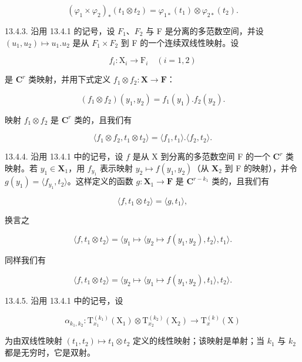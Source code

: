 \[
(\varphi_ {1} \times \varphi_ {2}) _ {*} (t _ {1} \otimes t _ {2}) = \varphi_ {1 *} (t _ {1}) \otimes \varphi_ {2 *} (t _ {2}).
\]

13.4.3. 沿用 13.4.1 的记号，设 \(F_{1}\)、\(F_{2}\) 与 F 是分离的多范数空间，并设 \((u_{1}, u_{2}) \mapsto u_{1}.u_{2}\) 是从 \(F_{1} \times F_{2}\) 到 F 的一个连续双线性映射。设

\[
f _ {i} \colon \mathrm{X} _ {i} \rightarrow \mathrm{F} _ {i} \quad (i = 1, 2)
\]

是 \(\mathbf{C}^r\) 类映射，并用下式定义 \(f_1 \otimes f_2: \mathbf{X} \to \mathbf{F}\)：

\[
(f _ {1} \otimes f _ {2}) (y _ {1}, y _ {2}) = f _ {1} (y _ {1}). f _ {2} (y _ {2}).
\]

映射 \(f_{1} \otimes f_{2}\) 是 \(\mathbf{C}^{r}\) 类的，且我们有

\[
\langle f _ {1} \otimes f _ {2}, t _ {1} \otimes t _ {2} \rangle = \langle f _ {1}, t _ {1} \rangle . \langle f _ {2}, t _ {2} \rangle .
\]

13.4.4. 沿用 13.4.1 中的记号，设 \(f\) 是从 X 到分离的多范数空间 F 的一个 \(\mathbf{C}^{r}\) 类映射。若 \(y_{1} \in \mathbf{X}_{1}\)，用 \(f_{y_{1}}\) 表示映射 \(y_{2} \mapsto f(y_{1}, y_{2})\)（从 \(\mathbf{X}_{2}\) 到 F 的映射），并令 \(g(y_{1}) = \langle f_{y_{1}}, t_{2} \rangle\)。这样定义的函数 \(g: \mathbf{X}_{1} \to \mathbf{F}\) 是 \(\mathbf{C}^{r - k_{1}}\) 类的，且我们有

\[
\langle f, t _ {1} \otimes t _ {2} \rangle = \langle g, t _ {1} \rangle ,
\]

换言之

\[
\langle f, t _ {1} \otimes t _ {2} \rangle = \langle y _ {1} \mapsto \langle y _ {2} \mapsto f (y _ {1}, y _ {2}), t _ {2} \rangle , t _ {1} \rangle .
\]

同样我们有

\[
\langle f, t _ {1} \otimes t _ {2} \rangle = \langle y _ {2} \mapsto \langle y _ {1} \mapsto f (y _ {1}, y _ {2}), t _ {1} \rangle , t _ {2} \rangle .
\]

13.4.5. 沿用 13.4.1 中的记号，设

\[
\alpha_ {k _ {1}, k _ {2}} \colon \mathrm{T} _ {x _ {1}} ^ {(k _ {1})} (\mathrm{X} _ {1}) \otimes \mathrm{T} _ {x _ {2}} ^ {(k _ {2})} (\mathrm{X} _ {2}) \rightarrow \mathrm{T} _ {x} ^ {(k)} (\mathrm{X})
\]

为由双线性映射 \((t_{1}, t_{2}) \mapsto t_{1} \otimes t_{2}\) 定义的线性映射；该映射是单射；当 \(k_{1}\) 与 \(k_{2}\) 都是无穷时，它是双射。


